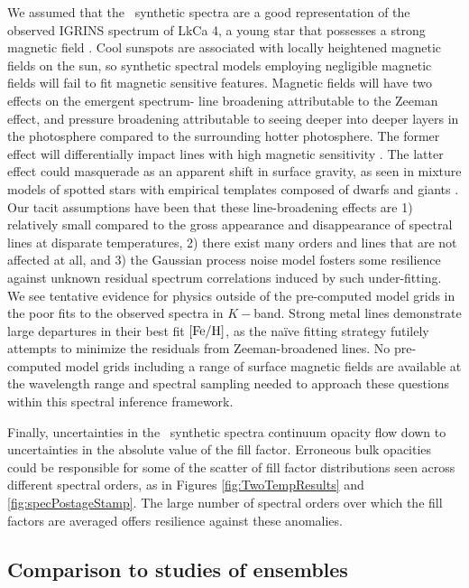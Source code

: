 \documentclass[twocolumn]{emulateapj}%
\begin{document}
We assumed that the \PHOENIX\ synthetic spectra are a good representation of the observed IGRINS spectrum of LkCa 4, a young star that possesses a strong magnetic field \citep{donati14}.  Cool sunspots are associated with locally heightened magnetic fields on the sun, so synthetic spectral models employing negligible magnetic fields will fail to fit magnetic sensitive features.  Magnetic fields will have two effects on the emergent spectrum- line broadening attributable to the Zeeman effect, and pressure broadening attributable to seeing deeper into deeper layers in the photosphere compared to the surrounding hotter photosphere.  The former effect will differentially impact lines with high magnetic sensitivity \citep[\emph{e.g.}][]{johnskrull99,deen13}.  The latter effect could masquerade as an apparent shift in surface gravity, as seen in mixture models of spotted stars with empirical templates composed of dwarfs and giants \citep{oneal96}.  Our tacit assumptions have been that these line-broadening effects are 1) relatively small compared to the gross appearance and disappearance of spectral lines at disparate temperatures, 2) there exist many orders and lines that are not affected at all, and 3) the Gaussian process noise model fosters some resilience against unknown residual spectrum correlations induced by such under-fitting.  We see tentative evidence for physics outside of the pre-computed model grids in the poor fits to the observed spectra in $K-$band.  Strong metal lines demonstrate large departures in their best fit $[{\rm Fe}/{\rm H}]$, as the na\"{i}ve fitting strategy futilely attempts to minimize the residuals from Zeeman-broadened lines.  No pre-computed model grids including a range of surface magnetic fields are available at the wavelength range and spectral sampling needed to approach these questions within this spectral inference framework.

Finally, uncertainties in the \PHOENIX\ synthetic spectra continuum opacity flow down to uncertainties in the absolute value of the fill factor.  Erroneous bulk opacities could be responsible for some of the scatter of fill factor distributions seen across different spectral orders, as in Figures \ref{fig:TwoTempResults} and \ref{fig:specPostageStamp}.  The large number of spectral orders over which the fill factors are averaged offers resilience against these anomalies.


\subsection{Comparison to studies of ensembles}
\end{document}
